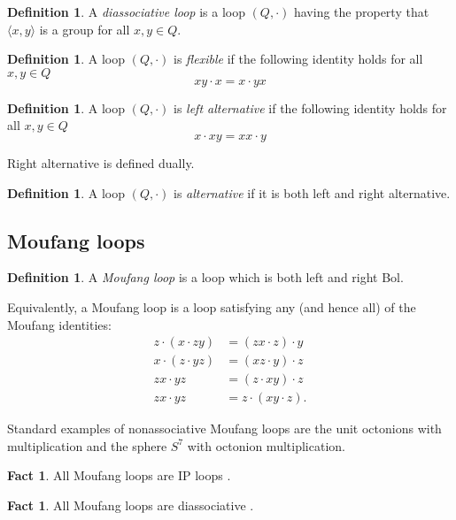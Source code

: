 \documentclass[12pt]{report}
\theoremstyle{definition}
\newtheorem{fct}[thm]{Fact}
\newtheorem{dfn}[thm]{Definition}
\begin{document}
\begin{dfn}
  A \emph{diassociative loop} is a loop $(Q, \cdot)$ having the property that $\langle x, y\rangle$ is a group
    for all $x, y\in Q$.
\end{dfn}

\begin{dfn}
  A loop $(Q, \cdot)$ is \emph{flexible} if the following identity holds for all $x, y\in Q$
  \[xy\cdot x = x\cdot yx\]
\end{dfn}

\begin{dfn}
  A loop $(Q, \cdot)$ is \emph{left alternative} if the following identity holds for all $x, y\in Q$
  \[x\cdot xy = xx\cdot y\]
\end{dfn}

Right alternative is defined dually.

\begin{dfn}
  A loop $(Q, \cdot)$ is \emph{alternative} if it is both left and right alternative.
\end{dfn}

\subsection{Moufang loops}

\begin{dfn}
  A \emph{Moufang loop} is a loop which is both left and right Bol.
\end{dfn}

Equivalently, a Moufang loop is a loop satisfying any (and hence all) of the Moufang identities:
  \begin{align*}
    z\cdot(x \cdot zy) &= (zx\cdot z)\cdot y\\
    x\cdot(z \cdot yz) &= (xz\cdot y)\cdot z\\
    zx\cdot yz &= (z\cdot xy)\cdot z\\
    zx\cdot yz &= z\cdot(xy\cdot z).
  \end{align*}

Standard examples of nonassociative Moufang loops are the unit octonions with multiplication and the sphere
  $S^7$ with octonion multiplication.

\begin{fct}
  All Moufang loops are IP loops \cite{Moufang}.
\end{fct}

\begin{fct}
  All Moufang loops are diassociative \cite{Moufang}.
\end{fct}
\end{document}

